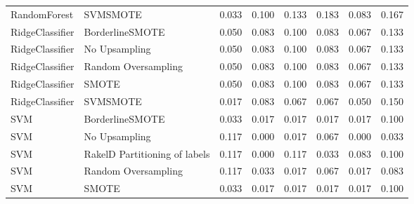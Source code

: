 \begin{tabular}{llllllll}
                   RandomForest &                      SVMSMOTE & 0.033 &                     0.100 &                 0.133 &                  0.183 &                                   0.083 &    0.167 \\
                RidgeClassifier &               BorderlineSMOTE & 0.050 &                     0.083 &                 0.100 &                  0.083 &                                   0.067 &    0.133 \\
                RidgeClassifier &                 No Upsampling & 0.050 &                     0.083 &                 0.100 &                  0.083 &                                   0.067 &    0.133 \\
                RidgeClassifier &           Random Oversampling & 0.050 &                     0.083 &                 0.100 &                  0.083 &                                   0.067 &    0.133 \\
                RidgeClassifier &                         SMOTE & 0.050 &                     0.083 &                 0.100 &                  0.083 &                                   0.067 &    0.133 \\
                RidgeClassifier &                      SVMSMOTE & 0.017 &                     0.083 &                 0.067 &                  0.067 &                                   0.050 &    0.150 \\
                            SVM &               BorderlineSMOTE & 0.033 &                     0.017 &                 0.017 &                  0.017 &                                   0.017 &    0.100 \\
                            SVM &                 No Upsampling & 0.117 &                     0.000 &                 0.017 &                  0.067 &                                   0.000 &    0.033 \\
                            SVM & RakelD Partitioning of labels & 0.117 &                     0.000 &                 0.117 &                  0.033 &                                   0.083 &    0.100 \\
                            SVM &           Random Oversampling & 0.117 &                     0.033 &                 0.017 &                  0.067 &                                   0.017 &    0.083 \\
                            SVM &                         SMOTE & 0.033 &                     0.017 &                 0.017 &                  0.017 &                                   0.017 &    0.100 \\

\end{tabular}
